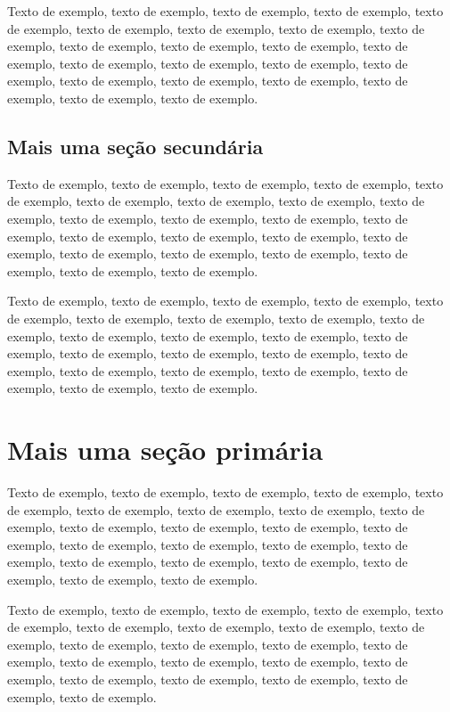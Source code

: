 \documentclass[
	12pt,				%
	oneside,			%
	a4paper,			%
	english,			%
	brazil				%
	]{abntex2ppgsi}
\begin{document}
Texto de exemplo, texto de exemplo, texto de exemplo, texto de exemplo, texto de exemplo, texto de exemplo, texto de exemplo, texto de exemplo, texto de exemplo, texto de exemplo, texto de exemplo, texto de exemplo, texto de exemplo, texto de exemplo, texto de exemplo, texto de exemplo, texto de exemplo, texto de exemplo, texto de exemplo, texto de exemplo, texto de exemplo, texto de exemplo, texto de exemplo.

\section{Mais uma seção secundária}

Texto de exemplo, texto de exemplo, texto de exemplo, texto de exemplo, texto de exemplo, texto de exemplo, texto de exemplo, texto de exemplo, texto de exemplo, texto de exemplo, texto de exemplo, texto de exemplo, texto de exemplo, texto de exemplo, texto de exemplo, texto de exemplo, texto de exemplo, texto de exemplo, texto de exemplo, texto de exemplo, texto de exemplo, texto de exemplo, texto de exemplo.

Texto de exemplo, texto de exemplo, texto de exemplo, texto de exemplo, texto de exemplo, texto de exemplo, texto de exemplo, texto de exemplo, texto de exemplo, texto de exemplo, texto de exemplo, texto de exemplo, texto de exemplo, texto de exemplo, texto de exemplo, texto de exemplo, texto de exemplo, texto de exemplo, texto de exemplo, texto de exemplo, texto de exemplo, texto de exemplo, texto de exemplo.

\chapter{Mais uma seção primária}

Texto de exemplo, texto de exemplo, texto de exemplo, texto de exemplo, texto de exemplo, texto de exemplo, texto de exemplo, texto de exemplo, texto de exemplo, texto de exemplo, texto de exemplo, texto de exemplo, texto de exemplo, texto de exemplo, texto de exemplo, texto de exemplo, texto de exemplo, texto de exemplo, texto de exemplo, texto de exemplo, texto de exemplo, texto de exemplo, texto de exemplo.

Texto de exemplo, texto de exemplo, texto de exemplo, texto de exemplo, texto de exemplo, texto de exemplo, texto de exemplo, texto de exemplo, texto de exemplo, texto de exemplo, texto de exemplo, texto de exemplo, texto de exemplo, texto de exemplo, texto de exemplo, texto de exemplo, texto de exemplo, texto de exemplo, texto de exemplo, texto de exemplo, texto de exemplo, texto de exemplo.
\end{document}
